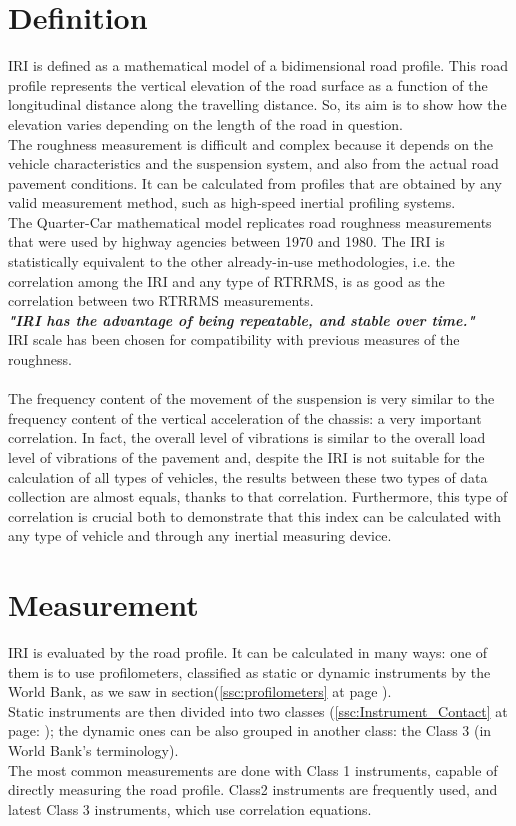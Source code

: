 \documentclass[tesi]{subfiles}
\begin{document}
\section{Definition}\label{sc:IRI Definition}
IRI is defined as a mathematical model of a bidimensional road profile. This road profile represents the vertical elevation of the road surface as a function of the longitudinal distance along the travelling distance\cite{wang2006road}. So, its aim is to show how the elevation varies depending on the length of the road in question.
\\The roughness measurement is difficult and complex because it depends on the vehicle characteristics and the suspension system, and also from the actual road pavement conditions. It can be calculated from profiles that are obtained by any valid measurement method, such as high-speed inertial profiling systems.\\
The Quarter-Car mathematical model replicates road roughness measurements that were used by highway agencies between 1970 and 1980. The IRI is statistically equivalent to the other already-in-use methodologies, i.e. the correlation among the IRI and any type of RTRRMS, is as good as the correlation between two RTRRMS measurements.
\\
\textbf{\textit{"IRI has the advantage of being repeatable, and stable over time."}}\\
IRI scale has been chosen for compatibility with previous measures of the roughness.\\\\
The frequency content of the movement of the suspension is very similar to the frequency content of the vertical acceleration of the chassis: a very important correlation. In fact, the overall level of vibrations is similar to the overall load level of vibrations of the pavement and, despite the IRI is not suitable for the calculation of all types of vehicles, the results between these two types of data collection are almost equals, thanks to that correlation. Furthermore, this type of correlation is crucial both to demonstrate that this index can be calculated with any type of vehicle and through any inertial measuring device.

\section{Measurement}\label{Measurement of IRI}
IRI is evaluated by the road profile. It can be calculated in many ways: one of them is to use profilometers, classified as static or dynamic instruments by the World Bank, as we saw in section(\ref{ssc:profilometers} at page \pageref{ssc:profilometers}).\\Static instruments are then divided into two classes (\ref{ssc:Instrument_Contact} at page: \pageref{ssc:Instrument_Contact}); the dynamic ones can be also grouped in another class: the Class 3 (in World Bank's terminology).\\ The most common measurements are done with Class 1 instruments, capable of directly measuring the road profile. Class2 instruments are frequently used, and latest Class 3 instruments, which use correlation equations.
\end{document}
